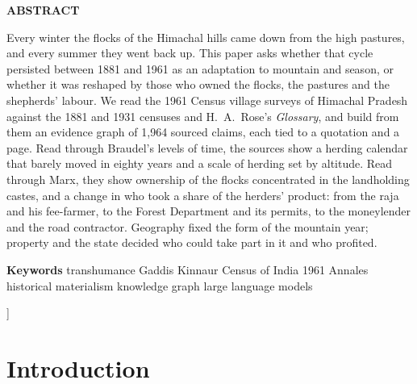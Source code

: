 \documentclass[10pt,a4paper,twocolumn]{article}
\begin{document}
{\begin{minipage}{\textwidth}
\begin{tcolorbox}[enhanced, colback=maroonlight, colframe=maroonlight, boxrule=0pt, arc=2pt,
  borderline west={3pt}{0pt}{maroon}, left=12pt, right=12pt, top=9pt, bottom=9pt]
{\sffamily\small\bfseries\color{maroon}\MakeUppercase{Abstract}}\par\vspace{4pt}
{\small Every winter the flocks of the Himachal hills came down from the high pastures, and every summer they went back up. This paper asks whether that cycle persisted between 1881 and 1961 as an adaptation to mountain and season, or whether it was reshaped by those who owned the flocks, the pastures and the shepherds' labour. We read the 1961 Census village surveys of Himachal Pradesh against the 1881 and 1931 censuses and H.~A.~Rose's \emph{Glossary}, and build from them an evidence graph of 1,964 sourced claims, each tied to a quotation and a page. Read through Braudel's levels of time, the sources show a herding calendar that barely moved in eighty years and a scale of herding set by altitude. Read through Marx, they show ownership of the flocks concentrated in the landholding castes, and a change in who took a share of the herders' product: from the raja and his fee-farmer, to the Forest Department and its permits, to the moneylender and the road contractor. Geography fixed the form of the mountain year; property and the state decided who could take part in it and who profited.\par}
\vspace{6pt}
{\sffamily\footnotesize\color{muted}\textbf{\color{maroon}Keywords}\; transhumance \textperiodcentered{} Gaddis \textperiodcentered{} Kinnaur \textperiodcentered{} Census of India 1961 \textperiodcentered{} Annales \textperiodcentered{} historical materialism \textperiodcentered{} knowledge graph \textperiodcentered{} large language models\par}
\end{tcolorbox}

\end{minipage}
\vspace{0.6cm}}]

\section{Introduction}
\end{document}
